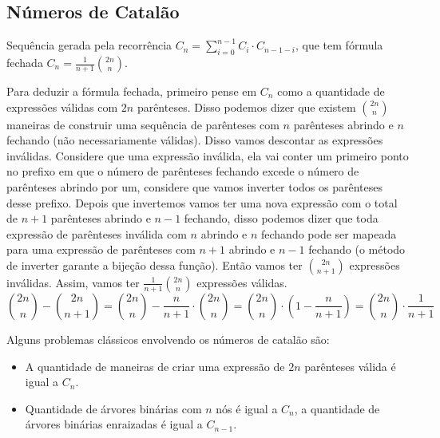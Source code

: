     \subsection{Números de Catalão}
    Sequência gerada pela recorrência $ C_n = \sum_{i=0}^{n-1}C_i \cdot C_{n-1-i}$, que tem fórmula fechada $C_n = \frac{1}{n+1} \binom{2n}{n}$.

    
    Para deduzir a fórmula fechada, primeiro pense em $C_n$ como a quantidade de expressões válidas com $2n$ parênteses. Disso podemos dizer que existem $\binom{2n}{n}$ maneiras de construir uma sequência de parênteses com $n$ parênteses abrindo e $n$ fechando (não necessariamente válidas). Disso vamos descontar as expressões inválidas. Considere que uma expressão inválida, ela vai conter um primeiro ponto no prefixo em que o número de parênteses fechando excede o número de parênteses abrindo por um, considere que vamos inverter todos os parênteses desse prefixo. Depois que invertemos vamos ter uma nova expressão com o total de $n+1$ parênteses abrindo e $n-1$ fechando, disso podemos dizer que toda expressão de parênteses inválida com $n$ abrindo e $n$ fechando pode ser mapeada para uma expressão de parênteses com $n+1$ abrindo e $n-1$ fechando (o método de inverter garante a bijeção dessa função). Então vamos ter $\binom{2n}{n+1}$ expressões inválidas. Assim, vamos ter $\frac{1}{n+1} \binom{2n}{n}$ expressões válidas.
    \[
       \binom{2n}{n} - \binom{2n}{n+1} = \binom{2n}{n} - \frac{n}{n+1} \cdot \binom{2n}{n} = \binom{2n}{n} \cdot \left( 1 - \frac{n}{n+1} \right) = \binom{2n}{n} \cdot \frac{1}{n+1}
    \]
    
    Alguns problemas clássicos envolvendo os números de catalão são:
    \begin{itemize}
        \item A quantidade de maneiras de criar uma expressão de $2n$ parênteses válida é igual a $C_n$.
        \item Quantidade de árvores binárias com $n$ nós é igual a $C_n$, a quantidade de árvores binárias enraizadas é igual a $C_{n-1}$.
    \end{itemize}
